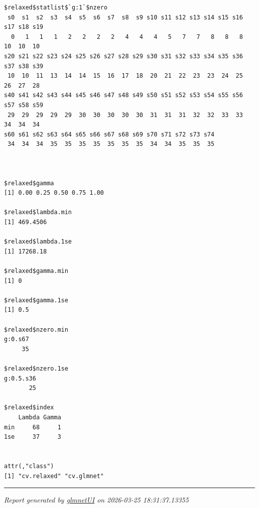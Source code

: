 \documentclass[
]{article}
\begin{document}
\begin{verbatim}
$relaxed$statlist$`g:1`$nzero
 s0  s1  s2  s3  s4  s5  s6  s7  s8  s9 s10 s11 s12 s13 s14 s15 s16 s17 s18 s19 
  0   1   1   1   2   2   2   2   4   4   4   5   7   7   8   8   8  10  10  10 
s20 s21 s22 s23 s24 s25 s26 s27 s28 s29 s30 s31 s32 s33 s34 s35 s36 s37 s38 s39 
 10  10  11  13  14  14  15  16  17  18  20  21  22  23  23  24  25  26  27  28 
s40 s41 s42 s43 s44 s45 s46 s47 s48 s49 s50 s51 s52 s53 s54 s55 s56 s57 s58 s59 
 29  29  29  29  29  30  30  30  30  30  31  31  31  32  32  33  33  34  34  34 
s60 s61 s62 s63 s64 s65 s66 s67 s68 s69 s70 s71 s72 s73 s74 
 34  34  34  35  35  35  35  35  35  35  34  34  35  35  35 



$relaxed$gamma
[1] 0.00 0.25 0.50 0.75 1.00

$relaxed$lambda.min
[1] 469.4506

$relaxed$lambda.1se
[1] 17268.18

$relaxed$gamma.min
[1] 0

$relaxed$gamma.1se
[1] 0.5

$relaxed$nzero.min
g:0.s67 
     35 

$relaxed$nzero.1se
g:0.5.s36 
       25 

$relaxed$index
    Lambda Gamma
min     68     1
1se     37     3


attr(,"class")
[1] "cv.relaxed" "cv.glmnet" 
\end{verbatim}

\begin{center}\rule{0.5\linewidth}{0.5pt}\end{center}

\emph{Report generated by
\href{https://github.com/wcraytor/glmnetUI}{glmnetUI} on 2026-03-25
18:31:37.13355}
\end{document}
